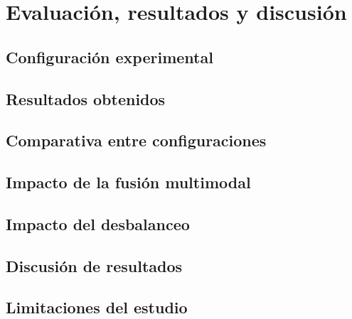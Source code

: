 \chapter{Evaluación, resultados y discusión}

\section{Configuración experimental}

\section{Resultados obtenidos}

\section{Comparativa entre configuraciones}

\section{Impacto de la fusión multimodal}

\section{Impacto del desbalanceo}

\section{Discusión de resultados}

\section{Limitaciones del estudio}